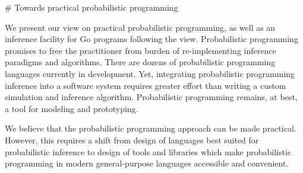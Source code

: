 # Towards practical probabilistic programming

We present our view on practical probabilistic programming, as
well as an inference facility for Go programs following the
view. Probabilistic programming promises to free the
practitioner from burden of re-implementing inference paradigms
and algorithms. There are dozens of probabilistic programming
languages currently in development. Yet, integrating
probabilistic programming inference into a software system
requires greater effort than writing a custom simulation and
inference algorithm. Probabilistic programming remains, at best,
a tool for modeling and prototyping.

We believe that the probabilistic programming approach can be
made practical. However, this requires a shift from design of
languages best suited for probabilistic inference to design
of tools and libraries which make probabilistic programming
in modern general-purpose languages accessible and convenient.


